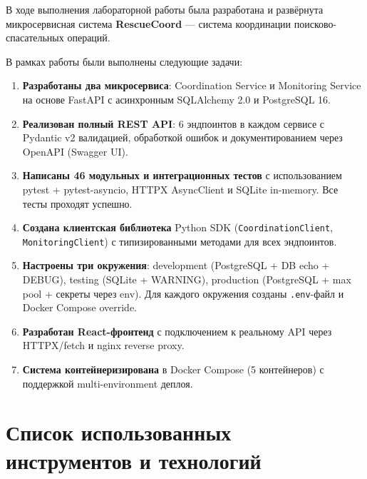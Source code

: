 \documentclass[12pt,a4paper]{article}
\begin{document}
В ходе выполнения лабораторной работы была разработана и развёрнута
микросервисная система \textbf{RescueCoord} --- система координации
поисково-спасательных операций.

В рамках работы были выполнены следующие задачи:

\begin{enumerate}
    \item \textbf{Разработаны два микросервиса}: Coordination Service и
          Monitoring Service на основе FastAPI с асинхронным
          SQLAlchemy 2.0 и PostgreSQL 16.

    \item \textbf{Реализован полный REST API}: 6 эндпоинтов в каждом сервисе
          с Pydantic v2 валидацией, обработкой ошибок и документированием через
          OpenAPI (Swagger UI).

    \item \textbf{Написаны 46 модульных и интеграционных тестов} с
          использованием pytest + pytest-asyncio, HTTPX AsyncClient и
          SQLite in-memory. Все тесты проходят успешно.

    \item \textbf{Создана клиентская библиотека} Python SDK (\texttt{CoordinationClient},
          \texttt{MonitoringClient}) с типизированными методами для всех
          эндпоинтов.

    \item \textbf{Настроены три окружения}: development (PostgreSQL + DB echo +
          DEBUG), testing (SQLite + WARNING), production (PostgreSQL + max pool
          + секреты через env). Для каждого окружения созданы \texttt{.env}-файл
          и Docker Compose override.

    \item \textbf{Разработан React-фронтенд} с подключением к реальному API
          через HTTPX/fetch и nginx reverse proxy.

    \item \textbf{Система контейнеризирована} в Docker Compose (5 контейнеров)
          с поддержкой multi-environment деплоя.
\end{enumerate}

\section*{Список использованных инструментов и технологий}
\end{document}
